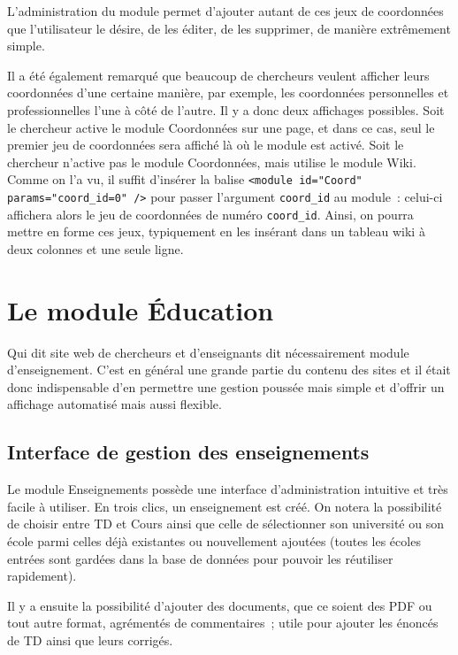 \documentclass[final,11pt,a4paper,twoside,titlepage]{article}
\newcommand{\p}{\vspace{0.3em}}
\newcommand{\code}[1]{\texttt{#1}}
\begin{document}
{    L'administration du module permet d'ajouter autant de ces jeux de coordonnées que
    l'utilisateur le désire, de les éditer, de les supprimer, de manière extrêmement
    simple. \p

    Il a été également remarqué que beaucoup de chercheurs veulent afficher leurs 
    coordonnées d'une certaine manière, par exemple, les coordonnées personnelles et
    professionnelles l'une à côté de l'autre. Il y a donc deux affichages possibles.
    Soit le chercheur active le module Coordonnées sur une page, et dans ce cas, seul le 
    premier jeu de coordonnées sera affiché là où le module est activé. Soit le chercheur
    n'active pas le module Coordonnées, mais utilise le module Wiki. Comme on l'a vu, 
	il suffit d'insérer la balise \code{<module id="Coord" params="coord\_id=0" />} pour
    passer l'argument \code{coord\_id} au module~: celui-ci affichera alors le jeu de
    coordonnées de numéro \code{coord\_id}. Ainsi, on pourra mettre en forme ces jeux,
    typiquement en les insérant dans un tableau wiki à deux colonnes et une seule 
    ligne.

  \section{Le module Éducation}
    Qui dit site web de chercheurs et d'enseignants dit nécessairement module 
	d'enseignement. C'est en général une grande partie du contenu des sites et il
    était donc indispensable d'en permettre une gestion poussée mais simple et
    d'offrir un affichage automatisé mais aussi flexible. 
 
    \subsection{Interface de gestion des enseignements}
    Le module Enseignements possède une interface d'administration intuitive et 
    très facile à utiliser. En trois clics, un enseignement est créé. On notera la
    possibilité de choisir entre TD et Cours ainsi que celle de sélectionner son 
	université ou son école parmi celles déjà existantes ou nouvellement ajoutées
	(toutes les écoles entrées sont gardées dans la base de données pour pouvoir 
	les réutiliser rapidement).\p
    
    Il y a ensuite la possibilité d'ajouter des documents, que ce soient des PDF
    ou tout autre format, agrémentés de commentaires~; utile pour ajouter les
    énoncés de TD ainsi que leurs corrigés. \p

}
\end{document}
